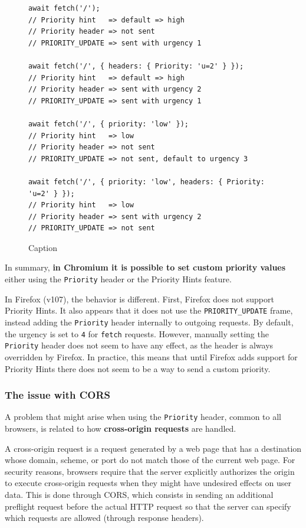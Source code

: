 \begin{figure}[h]
    \centering
    \begin{verbatim}
await fetch('/');
// Priority hint   => default => high
// Priority header => not sent
// PRIORITY_UPDATE => sent with urgency 1

await fetch('/', { headers: { Priority: 'u=2' } });
// Priority hint   => default => high
// Priority header => sent with urgency 2
// PRIORITY_UPDATE => sent with urgency 1

await fetch('/', { priority: 'low' });
// Priority hint   => low
// Priority header => not sent
// PRIORITY_UPDATE => not sent, default to urgency 3

await fetch('/', { priority: 'low', headers: { Priority: 'u=2' } });
// Priority hint   => low
// Priority header => sent with urgency 2
// PRIORITY_UPDATE => not sent
    \end{verbatim}
    \caption{Caption}
    \label{fig:chromium_fetch}
\end{figure}

In summary, \textbf{in Chromium it is possible to set custom priority values} either using the \texttt{Priority} header or the Priority Hints feature.

In Firefox (v107), the behavior is different. First, Firefox does not support Priority Hints. It also appears that it does not use the \texttt{PRIORITY\_UPDATE} frame, instead adding the \texttt{Priority} header internally to outgoing requests. By default, the urgency is set to \texttt{4} for \texttt{fetch} requests. However, manually setting the \texttt{Priority} header does not seem to have any effect, as the header is always overridden by Firefox. In practice, this means that until Firefox adds support for Priority Hints there does not seem to be a way to send a custom priority.

\subsubsection{The issue with CORS}
\label{sec:eval/browsers/cors}

A problem that might arise when using the \texttt{Priority} header, common to all browsers, is related to how \textbf{cross-origin requests} are handled.

A cross-origin request is a request generated by a web page that has a destination whose domain, scheme, or port do not match those of the current web page. For security reasons, browsers require that the server explicitly authorizes the origin to execute cross-origin requests when they might have undesired effects on user data. This is done through CORS, which consists in sending an additional preflight request before the actual HTTP request so that the server can specify which requests are allowed (through response headers).

